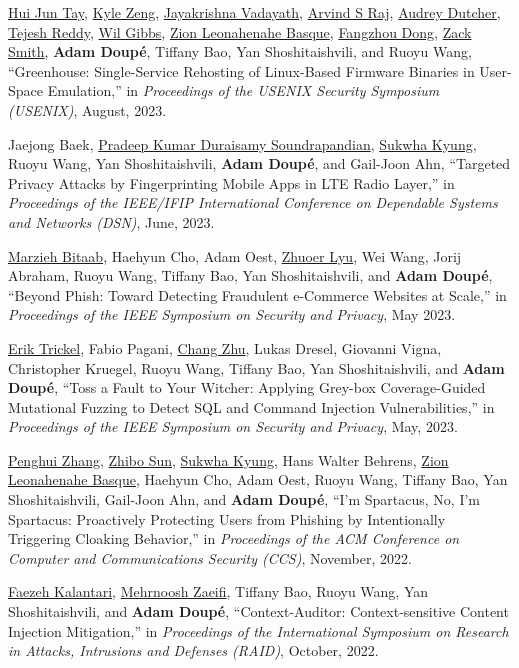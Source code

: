\documentclass[11pt,letterpaper,sans]{moderncv}
\begin{document}
\begin{etaremune}
\item \underline{Hui Jun Tay}, \underline{Kyle Zeng}, \underline{Jayakrishna Vadayath}, \underline{Arvind S Raj}, \underline{Audrey Dutcher}, \underline{Tejesh Reddy}, \underline{Wil Gibbs}, \underline{Zion Leonahenahe Basque}, \underline{Fangzhou Dong}, \underline{Zack Smith}, \textbf{Adam Doup\'e}, Tiffany Bao, Yan Shoshitaishvili, and Ruoyu Wang, ``Greenhouse: Single-Service Rehosting of Linux-Based Firmware Binaries in User-Space Emulation,'' in \emph{Proceedings of the USENIX Security Symposium (USENIX)}, August, 2023.

\item Jaejong Baek, \underline{Pradeep Kumar Duraisamy Soundrapandian}, \underline{Sukwha Kyung}, Ruoyu Wang, Yan Shoshitaishvili, \textbf{Adam Doup\'e}, and Gail-Joon Ahn, ``Targeted Privacy Attacks by Fingerprinting Mobile Apps in LTE Radio Layer,'' in \emph{Proceedings of the IEEE/IFIP International Conference on Dependable Systems and Networks (DSN)}, June, 2023.
  
\item \underline{Marzieh Bitaab}, Haehyun Cho, Adam Oest, \underline{Zhuoer Lyu}, Wei Wang, Jorij Abraham, Ruoyu Wang, Tiffany Bao, Yan Shoshitaishvili, and \textbf{Adam Doup\'e}, ``Beyond Phish: Toward Detecting Fraudulent e-Commerce Websites at Scale,'' in \emph{Proceedings of the IEEE Symposium on Security and Privacy}, May 2023.

\item \underline{Erik Trickel},  Fabio Pagani, \underline{Chang Zhu}, Lukas Dresel,  Giovanni Vigna,  Christopher Kruegel, Ruoyu Wang,  Tiffany Bao,  Yan Shoshitaishvili, and  \textbf{Adam Doup\'e}, ``Toss a Fault to Your Witcher: Applying Grey-box Coverage-Guided Mutational Fuzzing to Detect SQL and Command Injection Vulnerabilities,'' in \emph{Proceedings of the IEEE Symposium on Security and Privacy}, May, 2023.

\item \underline{Penghui Zhang},  \underline{Zhibo Sun}, \underline{Sukwha Kyung},  Hans Walter Behrens,  \underline{Zion Leonahenahe Basque}, Haehyun Cho,  Adam Oest,  Ruoyu Wang,  Tiffany Bao,  Yan Shoshitaishvili,  Gail-Joon Ahn, and \textbf{Adam Doup\'e}, ``I'm Spartacus, No, I'm Spartacus: Proactively Protecting Users from Phishing by Intentionally Triggering Cloaking Behavior,'' in \emph{Proceedings of the ACM Conference on Computer and Communications Security (CCS)}, November, 2022.

\item \underline{Faezeh Kalantari}, \underline{Mehrnoosh Zaeifi},  Tiffany Bao,  Ruoyu Wang,  Yan Shoshitaishvili, and  \textbf{Adam Doup\'e}, ``Context-Auditor: Context-sensitive Content Injection Mitigation,'' in \emph{Proceedings of the International Symposium on Research in Attacks, Intrusions and Defenses (RAID)}, October, 2022.
  

\end{etaremune}
\end{document}
